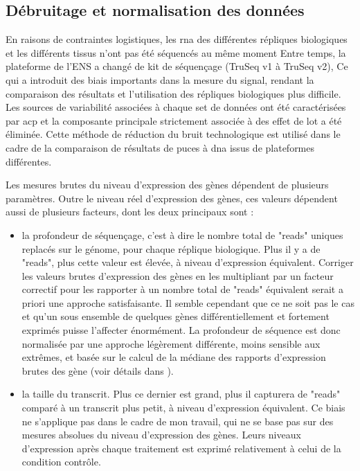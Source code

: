 \documentclass[../main.tex]{subfiles}
\begin{document}
\subsection{Débruitage et normalisation des données}
En raisons de contraintes logistiques, les \gls{rna} des différentes répliques biologiques et les différents tissus n'ont pas été séquencés au même moment
Entre temps, la plateforme de l'ENS a changé de kit de séquençage (TruSeq v1 à TruSeq v2), Ce qui a introduit des biais importants dans la mesure du signal, rendant la comparaison des résultats et l'utilisation des répliques biologiques plus difficile.
Les sources de variabilité associées à chaque set de données ont été caractérisées par \gls{acp} et la composante principale strictement associée à des effet de lot a été éliminée.
Cette méthode de réduction du bruit technologique est utilisé dans le cadre de la comparaison de résultats de puces à \gls{dna} issus de plateformes différentes.
\par
Les mesures brutes du niveau d'expression des gènes dépendent de plusieurs paramètres.
Outre le niveau réel d'expression des gènes, ces valeurs dépendent aussi de plusieurs facteurs, dont les deux principaux sont :
\begin{itemize}
\item la profondeur de séquençage, c'est à dire le nombre total de "reads" uniques replacés sur le génome, pour chaque réplique biologique.
Plus il y a de "reads", plus cette valeur est élevée, à niveau d'expression équivalent. Corriger les valeurs brutes d'expression des gènes en les multipliant par un facteur correctif pour les rapporter à un nombre total de "reads" équivalent serait a priori une approche satisfaisante.
Il semble cependant que ce ne soit pas le cas et qu'un sous ensemble de quelques gènes différentiellement et fortement exprimés puisse l'affecter énormément.
La profondeur de séquence est donc normalisée par une approche légèrement différente, moins sensible aux extrêmes, et basée sur le calcul de la médiane des rapports d'expression brutes des gène (voir détails dans \citealp{Anders2010}).
\item la taille du transcrit. Plus ce dernier est grand, plus il capturera de "reads" comparé à un transcrit plus petit, à niveau d'expression équivalent.
Ce biais ne s'applique pas dans le cadre de mon travail, qui ne se base pas sur des mesures absolues du niveau d'expression des gènes.
Leurs niveaux d'expression après chaque traitement est exprimé relativement à celui de la condition contrôle.
\end{itemize}
\end{document}
